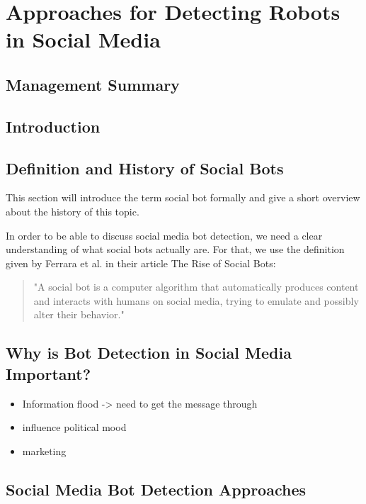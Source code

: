\newpage
\chapter{Approaches for Detecting Robots \\ in Social Media}
\section*{Management Summary}


\section{Introduction}


\section{Definition and History of Social Bots} 
This section will introduce the term social bot formally and give a short overview about the history of this topic.

In order to be able to discuss social media bot detection, we need a clear understanding of what social bots actually are.  For that, we use the definition given by Ferrara et al. in their article The Rise of Social Bots:
\begin{quote}
	"A social bot is a computer algorithm that automatically produces content and interacts with humans on social media, trying to emulate and possibly alter their behavior." \cite{ferrara15}
\end{quote}


\section{Why is Bot Detection in Social Media Important?}%
\begin{itemize}
	\item Information flood -> need to get the message through
	\item influence political mood
	\item marketing
\end{itemize}

\section{Social Media Bot Detection Approaches}


